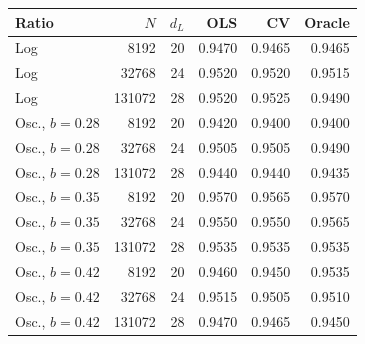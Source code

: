 \begin{tabular}{lrrrrr}
\toprule
Ratio & $N$ & $d_L$ & OLS & CV & Oracle \\
\midrule
Log & 8192 & 20 & 0.9470 & 0.9465 & 0.9465 \\
Log & 32768 & 24 & 0.9520 & 0.9520 & 0.9515 \\
Log & 131072 & 28 & 0.9520 & 0.9525 & 0.9490 \\
Osc., $b=0.28$ & 8192 & 20 & 0.9420 & 0.9400 & 0.9400 \\
Osc., $b=0.28$ & 32768 & 24 & 0.9505 & 0.9505 & 0.9490 \\
Osc., $b=0.28$ & 131072 & 28 & 0.9440 & 0.9440 & 0.9435 \\
Osc., $b=0.35$ & 8192 & 20 & 0.9570 & 0.9565 & 0.9570 \\
Osc., $b=0.35$ & 32768 & 24 & 0.9550 & 0.9550 & 0.9565 \\
Osc., $b=0.35$ & 131072 & 28 & 0.9535 & 0.9535 & 0.9535 \\
Osc., $b=0.42$ & 8192 & 20 & 0.9460 & 0.9450 & 0.9535 \\
Osc., $b=0.42$ & 32768 & 24 & 0.9515 & 0.9505 & 0.9510 \\
Osc., $b=0.42$ & 131072 & 28 & 0.9470 & 0.9465 & 0.9450 \\
\bottomrule
\end{tabular}
